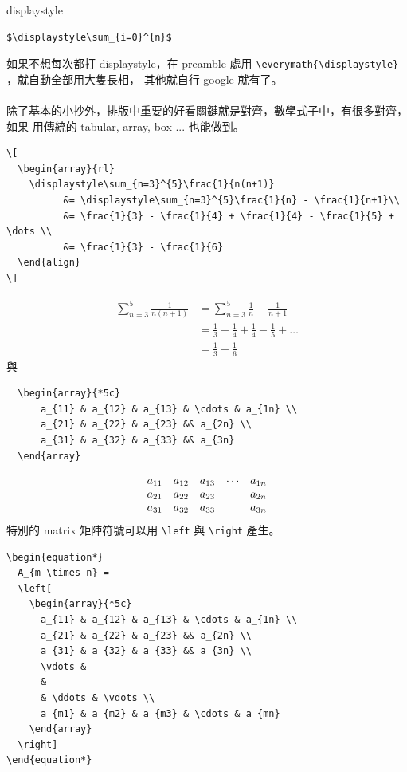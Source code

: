 displaystyle
\begin{verbatim}
$\displaystyle\sum_{i=0}^{n}$
\end{verbatim}
如果不想每次都打 displaystyle，在 preamble 處用 \verb=\everymath{\displaystyle}=
，就自動全部用大隻長相， 其他就自行 google 就有了。
\\\\
除了基本的小抄外，排版中重要的好看關鍵就是對齊，數學式子中，有很多對齊，如果
用傳統的 tabular, array, box ... 也能做到。
\begin{verbatim}
\[
  \begin{array}{rl}
    \displaystyle\sum_{n=3}^{5}\frac{1}{n(n+1)}
          &= \displaystyle\sum_{n=3}^{5}\frac{1}{n} - \frac{1}{n+1}\\
          &= \frac{1}{3} - \frac{1}{4} + \frac{1}{4} - \frac{1}{5} + \dots \\
          &= \frac{1}{3} - \frac{1}{6}
  \end{align}
\]
\end{verbatim}
\begin{equation*}
  \begin{array}{rl}
    \displaystyle\sum_{n=3}^{5}\frac{1}{n(n+1)}
          &= \displaystyle\sum_{n=3}^{5}\frac{1}{n} - \frac{1}{n+1}\\
          &= \frac{1}{3} - \frac{1}{4} + \frac{1}{4} - \frac{1}{5} + \dots \\
          &= \frac{1}{3} - \frac{1}{6}
  \end{array}
\end{equation*}
與
\begin{verbatim}
  \begin{array}{*5c}
      a_{11} & a_{12} & a_{13} & \cdots & a_{1n} \\
      a_{21} & a_{22} & a_{23} && a_{2n} \\
      a_{31} & a_{32} & a_{33} && a_{3n} 
  \end{array}
\end{verbatim}
\[
  \begin{array}{*5c}
      a_{11} & a_{12} & a_{13} & \cdots & a_{1n} \\
      a_{21} & a_{22} & a_{23} && a_{2n} \\
      a_{31} & a_{32} & a_{33} && a_{3n} 
  \end{array}
\]
特別的 matrix 矩陣符號可以用 \verb=\left= 與 \verb=\right= 產生。
\begin{verbatim}
\begin{equation*}
  A_{m \times n} =
  \left[
    \begin{array}{*5c}
      a_{11} & a_{12} & a_{13} & \cdots & a_{1n} \\
      a_{21} & a_{22} & a_{23} && a_{2n} \\
      a_{31} & a_{32} & a_{33} && a_{3n} \\
      \vdots & 
      &
      & \ddots & \vdots \\
      a_{m1} & a_{m2} & a_{m3} & \cdots & a_{mn}
    \end{array}
  \right]
\end{equation*}
\end{verbatim}
